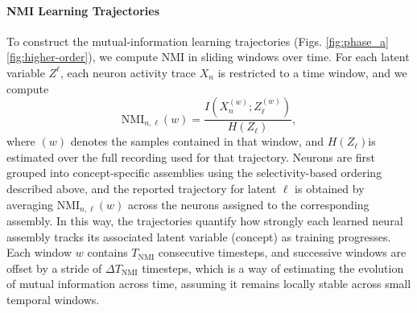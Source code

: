 \documentclass{article}
\begin{document}
\paragraph{NMI Learning Trajectories}
To construct the mutual-information learning trajectories (Figs. \ref{fig:phase_a} \ref{fig:higher-order}), we compute NMI in sliding windows over time. For each latent variable $Z^\ell$, each neuron activity trace $X_n$ is restricted to a time window, and we compute
\[
\mathrm{NMI}_{n,\ell}(w)
=
\frac{I(X_n^{(w)}; Z_\ell^{(w)})}{H(Z_\ell)},
\]
where $(w)$ denotes the samples contained in that window, and \(H(Z_\ell)\)is estimated over the full recording used for that trajectory. Neurons are first grouped into concept-specific assemblies using the selectivity-based ordering described above, and the reported trajectory for latent $\ell$ is obtained by averaging $\mathrm{NMI}_{n,\ell}(w)$ across the neurons assigned to the corresponding assembly. In this way, the trajectories quantify how strongly each learned neural assembly tracks its associated latent variable (concept) as training progresses. Each window \(w\) contains \(T_\textrm{NMI}\) consecutive timesteps, and successive windows are offset by a stride of \(\Delta T_\textrm{NMI}\) timesteps, which is a way of estimating the evolution of mutual information across time, assuming it remains locally stable across small temporal windows.
\end{document}
